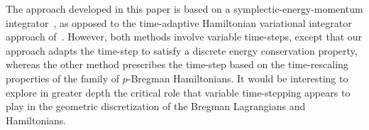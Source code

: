 \documentclass[letterpaper, 10pt, conference]{ieeeconf}
\begin{document}
The approach developed in this paper is based on a symplectic-energy-momentum integrator~\cite{KaMaOr1999}, as opposed to the time-adaptive Hamiltonian variational integrator approach of~\cite{DuScLe2021}. However, both methods involve variable time-steps, except that our approach adapts the time-step to satisfy a discrete energy conservation property, whereas the other method prescribes the time-step based on the time-rescaling properties of the family of $p$-Bregman Hamiltonians. It would be interesting to explore in greater depth the critical role that variable time-stepping appears to play in the geometric discretization of the Bregman Lagrangians and Hamiltonians.






\end{document}
